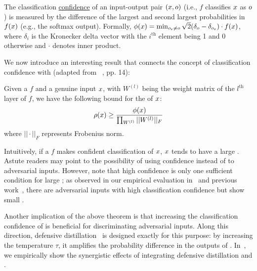 
\begin{definition}[Confidence]
The classification \underline{confidence} of an input-output pair $(x, o)$ (i.e., $f$ classifies $x$ as $o$) is measured by the difference of the largest and second largest probabilities in $f(x)$ (e.g., the softmax output). Formally,
$\phi(x)  =  \min_{o_\epsilon \neq o} \sqrt{2}(\delta_{o} - \delta_{o_\epsilon}) \cdot f(x)
$, where $\delta_i$ is the Kronecker delta vector with the $i^{\mathrm{th}}$ element being 1 and 0 otherwise and $\cdot$ denotes inner product.
\end{definition}

We now introduce an interesting result that connects the concept of classification confidence with \mar (adapted from~\cite{Sokolic:2016:arXiv} , pp. 14):

\begin{theorem*}
Given a \dnn $f$ and a genuine input $x$, with $W^{(l)}$ being the weight matrix of the $l^{\mathrm{th}}$ layer of $f$, we have the following bound for the \ar of $x$:
\begin{equation*}
\rho(x) \geq  \frac{  \phi(x) }{  \prod_{W^{(l)}} ||W^{(l)}||_F }
\end{equation*}
where $||\cdot||_F$ represents Frobenius norm.
\end{theorem*}

Intuitively, if a \dnn $f$ makes confident classification of $x$, $x$ tends to have a large \ar. Astute readers may point to the possibility of using confidence instead of \mar to adversarial inputs. However, note that high confidence is only one sufficient condition for large \ars; as observed in our empirical evaluation in~ and previous work~\cite{Goodfellow:2014:arxiv}, there are adversarial inputs with high classification confidence but show small \ars.

Another implication of the above theorem is that increasing the classification confidence of \dnns is beneficial for discriminating adversarial inputs. Along this direction, defensive distillation~\cite{Papernot:2016:sp} is designed exactly for this purpose: by increasing the temperature $\tau$, it amplifies the probability difference in the outputs of \dnns.
In~, we empirically show the synergistic effects of integrating defensive distillation and \system.


